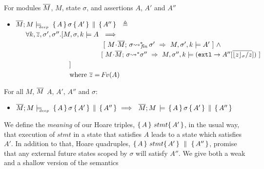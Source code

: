 \begin{definition}
\label{def:restrict:sat}
For modules $\overline{M}$, $M$, state $\sigma$,  
and assertions $A$, $A'$ and  $A''$
\begin{itemize}
\item
$ {\overline{M};M \models\!\!\!\!_{_{deep}}\  \, \{\, A\,\}\, \sigma\, \{\, A'\,\} \,\parallel\, \{\, A''\,\}  } \ \ \triangleq \ \ $  \\
$\strut \hspace{.5cm} \forall k, \overline{z}, \sigma',\sigma''.[
  M,\sigma ,{k} \models {A}   \  
  \ \Longrightarrow$\\
$\strut \hspace{4.5cm}    [ \ {\leadstoBoundedStarFin {M\madd \Mtwo}{\sigma}  {\sigma'} }\  \Rightarrow \    \satDAssertFrom M  {\sigma'} k   {\sdN{A'}}   \ ]
 \ \wedge$\\
$\strut \hspace{4.5cm}    [ \ {\leadstoBoundedStar  {M\madd \Mtwo}{\sigma}  {\sigma''} }\  \Rightarrow\      \satDAssertFrom M  {\sigma''}  k  {(\externalexec \rightarrow A''[\sdN{\overline{\interpret \sigma z/z}}])} \ ] $\\
$\strut \hspace{2.3cm}\ \ \ \ ]  $ \\
$\strut \hspace{2.3cm}\ \ \ \  \mbox{where }  {{ \overline z= {\hspace{-1pt}F\hspace{-1pt}}v(A)}}$ %
\end{itemize}
\end{definition}



 
\begin{lemma} 
For all $M$, $\overline{M}$ $A$, $A'$, $A''$ and $\sigma$:
\begin{itemize}
\item
$ {\overline{M};M \models\!\!\!\!_{_{deep}}\  \, \{\, A\,\}\, \sigma\, \{\, A'\,\} \,\parallel\, \{\, A''\,\}  } \ \Longrightarrow \ \
  {\overline{M}; M\, \models \, \{\, A\,\}\, \sigma \, \{\, A'\,\} \,\parallel\, \{\, A''\,\}  } $
\end{itemize}
\end{lemma}

\label{sect:HLmeans}

We  define the {\emph {meaning}} of  our Hoare triples, $ \{\, A \, \}\ stmt \{\, A' \, \}$,  in the usual way, \ie that execution of $stmt$ in a state that satisfies $A$ leads to a state which satisfies $A'$.  
In addition to that, Hoare quadruples, $ \{\, A \, \}\ stmt \{\, A' \, \} \, \,\parallel\,\, \{\, A'' \, \} $, promise that any external future states scoped by $\sigma$ will satisfy $A''$.
We give both a weak and a shallow version of the semantics


